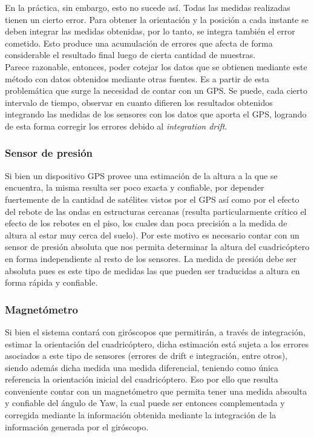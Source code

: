 \documentclass[main]{subfiles}
\begin{document}
En la pr\'actica, sin embargo, esto no sucede as\'i. Todas las medidas realizadas tienen un cierto error. Para obtener la orientaci\'on y la posici\'on a cada instante se deben integrar las medidas obtenidas, por lo tanto, se integra tambi\'en el error cometido. Esto produce una acumulaci\'on de errores que afecta de forma considerable el resultado final luego de cierta cantidad de muestras.\\
Parece razonable, entonces, poder cotejar los datos que se obtienen mediante este m\'etodo con datos obtenidos mediante otras fuentes. Es a partir de esta problem\'atica que surge la necesidad de contar con un GPS. Se puede, cada cierto intervalo de tiempo, observar en cuanto difieren los resultados obtenidos integrando las medidas de los sensores con los datos que aporta el GPS, logrando de esta forma corregir los errores debido al \emph{integration drift}.

\subsubsection{Sensor de presi\'on}

Si bien un dispositivo GPS provee una estimaci\'on de la altura a la que se encuentra, la misma resulta ser poco exacta y confiable, por depender fuertemente de la cantidad de sat\'elites vistos por el GPS as\'i como por el efecto del rebote de las ondas en estructuras cercanas (resulta particularmente cr\'itico el efecto de los rebotes en el piso, los cuales dan poca precisi\'on a la medida de altura al estar muy cerca del suelo). Por este motivo es necesario contar con un sensor de presi\'on absoluta que nos permita determinar la altura del cuadric\'optero en forma independiente al resto de los sensores. La medida de presi\'on debe ser absoluta pues es este tipo de medidas las que pueden ser traducidas a altura en forma r\'apida y confiable.

\subsubsection{Magnet\'ometro}

Si bien el sistema contar\'a con gir\'oscopos que permitir\'an, a trav\'es de integraci\'on, estimar la orientaci\'on del cuadric\'optero, dicha estimaci\'on est\'a sujeta a los errores asociados a este tipo de sensores (errores de drift e integraci\'on, entre otros), siendo adem\'as dicha medida una medida diferencial, teniendo como \'unica referencia la orientaci\'on inicial del cuadric\'optero. Eso por ello que resulta conveniente contar con un magnet\'ometro que permita tener una medida absoulta y confiable del \'angulo de Yaw, la cual puede ser entonces complementada y corregida mediante la informaci\'on obtenida mediante la integraci\'on de la informaci\'on generada por el gir\'oscopo.
\end{document}
